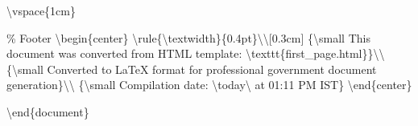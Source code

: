 \textbackslash{}vspace\{1cm\}

\% Footer
\textbackslash{}begin\{center\}
\textbackslash{}rule\{\textbackslash{}textwidth\}\{0.4pt\}\textbackslash{}\textbackslash{}[0.3cm]
\{\textbackslash{}small This document was converted from HTML template: \textbackslash{}texttt\{first\_page.html\}\}\textbackslash{}\textbackslash{}
\{\textbackslash{}small Converted to LaTeX format for professional government document generation\}\textbackslash{}\textbackslash{}
\{\textbackslash{}small Compilation date: \textbackslash{}today\textbackslash{} at 01:11 PM IST\}
\textbackslash{}end\{center\}

\textbackslash{}end\{document\}